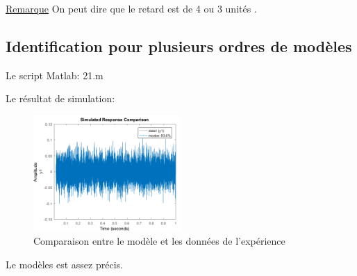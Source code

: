 \documentclass[twoside,twocolumn]{article}
\begin{document}
\underline{Remarque}
On peut dire que le retard est de 4 ou 3 unités .

\subsection{Identification pour plusieurs ordres de modèles}
Le script Matlab:
\label{matlab}
 {21.m}

Le résultat de simulation:
\begin{figure}[H]
\centering
\includegraphics[width=0.5\textwidth]{Images/21.png}
\caption{Comparaison entre le modèle et les données de l'expérience}
\end{figure}

Le modèles est assez précis.
\end{document}

